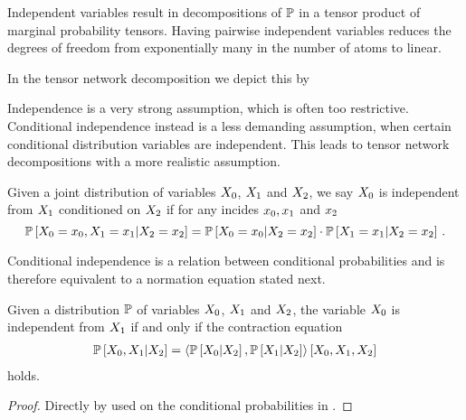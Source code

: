 Independent variables result in decompositions of $\mathbb{P}$ in a tensor product of marginal probability tensors. 
Having pairwise independent variables reduces the degrees of freedom from exponentially many in the number of atoms to linear.

In the tensor network decomposition we depict this by
	\begin{center}
		
	\end{center}

Independence is a very strong assumption, which is often too restrictive.
Conditional independence instead is a less demanding assumption, when certain conditional distribution variables are independent. 
This leads to tensor network decompositions with a more realistic assumption.

\begin{definition}\label{def:condIndependence}
	Given a joint distribution of variables $X_{0}$, $X_{1}$ and $X_{2}$, we say $X_{0}$ is independent from $X_{1}$ conditioned on $X_{2}$ if for any incides $x_{0},x_{1}$ and $x_{2}$
		\[ \mathbb{P}\left[X_{0}=x_{0},X_{1}=x_{1}|X_{2}=x_{2}\right] 
		= \mathbb{P}\left[X_{0}=x_{0}|X_{2}=x_{2}\right] 
		\cdot \mathbb{P}\left[X_{1}=x_{1}|X_{2}=x_{2}\right]   \, . \]
\end{definition}

Conditional independence is a relation between conditional probabilities and is therefore equivalent to a normation equation stated next.

\begin{theorem}\label{the:condIndependenceProductCriterion}
	Given a distribution $\mathbb{P}$ of variables $X_{0}$, $X_{1}$ and $X_{2}$, the variable $X_{0}$ is independent from $X_{1}$ if and only if the contraction equation
	\begin{align*}
		 \mathbb{P}\left[X_{0},X_{1}|X_{2}\right] 
		 = \left\langle 
		 \mathbb{P}\left[X_{0}|X_{2}\right] ,\mathbb{P}\left[X_{1}|X_{2}\right] 
		 \right\rangle \left[ X_{0},X_{1},X_{2} \right]
	\end{align*}
	holds.
\end{theorem}
\begin{proof}
	Directly by  used on the conditional probabilities in .
\end{proof}

